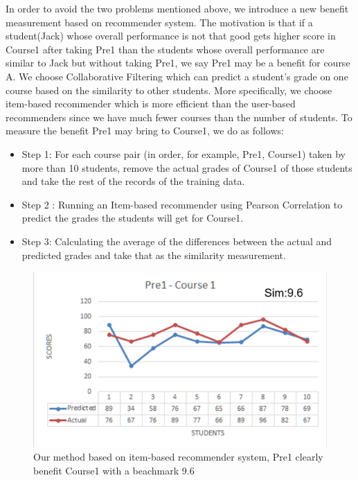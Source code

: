 In order to avoid the two problems mentioned above, we introduce a new benefit measurement based on recommender system. The motivation is that if a student(Jack) whose overall performance is not that good gets higher score in Course1 after taking Pre1 than the students whose overall performance are similar to Jack but without taking Pre1, we say Pre1 may be a benefit for course A.  We choose Collaborative Filtering which can predict a student’s grade on one course based on the similarity to other students. More specifically, we choose item-based recommender which is more efficient than the user-based recommenders since we have much fewer courses than the number of students.  To measure the benefit Pre1 may bring to Course1, we do as follows:
\begin{itemize}
	\item Step 1: For each course pair (in order, for example, Pre1, Course1) taken by more than 10 students, remove the actual grades of Course1 of those students and take the rest of the records of the training data. 
	\item Step 2 : Running an Item-based recommender using Pearson Correlation to predict the grades the students will get for Course1.
	\item Step 3: Calculating the average of the differences between the actual and predicted grades and take that as the similarity measurement.
\end{itemize}
\begin{figure}[h]
	\centering %
	\includegraphics[width=\columnwidth]{figs/measure} 
	\caption{Our method based on item-based recommender system, Pre1 clearly benefit Course1 with a beachmark 9.6}
	\label{fig:sample}
\end{figure}

